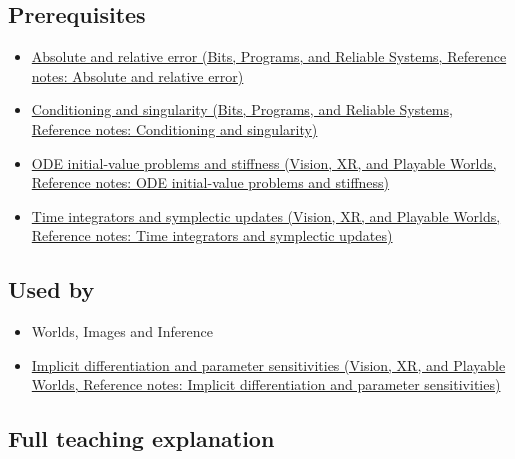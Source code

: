 \subsection{Prerequisites}\label{appendix-18eacf61a04b-prerequisites}

\begin{itemize}
\tightlist
\item
  \href{../01-Bits-Programs-and-Reliable-Systems/main.pdf\#nameddest=appendix-3ae74e89b4e6}{Absolute and relative error (Bits, Programs, and Reliable Systems, Reference notes: Absolute and relative error)}
\item
  \href{../01-Bits-Programs-and-Reliable-Systems/main.pdf\#nameddest=appendix-8f6a01f284a7}{Conditioning and singularity (Bits, Programs, and Reliable Systems, Reference notes: Conditioning and singularity)}
\item
  \href{../07-Vision-XR-and-Playable-Worlds/main.pdf\#nameddest=appendix-e8ab9836882e}{ODE initial-value problems and stiffness (Vision, XR, and Playable Worlds, Reference notes: ODE initial-value problems and stiffness)}
\item
  \href{../07-Vision-XR-and-Playable-Worlds/main.pdf\#nameddest=appendix-8f96f9c4d5bc}{Time integrators and symplectic updates (Vision, XR, and Playable Worlds, Reference notes: Time integrators and symplectic updates)}
\end{itemize}

\subsection{Used by}\label{appendix-18eacf61a04b-used-by}

\begin{itemize}
\tightlist
\item
  {Worlds, Images and Inference}
\item
  \href{../07-Vision-XR-and-Playable-Worlds/main.pdf\#nameddest=appendix-8836553d56fc}{Implicit differentiation and parameter sensitivities (Vision, XR, and Playable Worlds, Reference notes: Implicit differentiation and parameter sensitivities)}
\end{itemize}

\subsection{Full teaching explanation}\label{appendix-18eacf61a04b-full-teaching-explanation}

